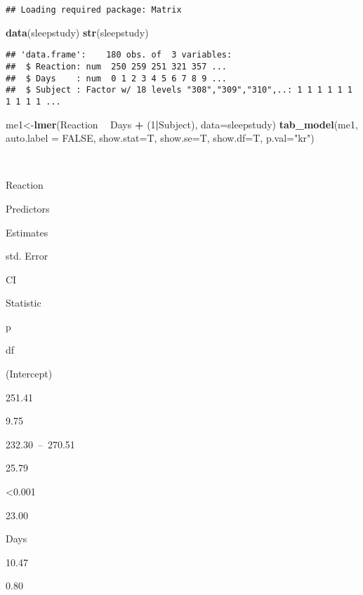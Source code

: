 \documentclass[]{article}
\newenvironment{Shaded}{\begin{snugshade}}{\end{snugshade}}
\newcommand{\KeywordTok}[1]{\textcolor[rgb]{0.13,0.29,0.53}{\textbf{#1}}}
\newcommand{\DataTypeTok}[1]{\textcolor[rgb]{0.13,0.29,0.53}{#1}}
\newcommand{\DecValTok}[1]{\textcolor[rgb]{0.00,0.00,0.81}{#1}}
\newcommand{\StringTok}[1]{\textcolor[rgb]{0.31,0.60,0.02}{#1}}
\newcommand{\OtherTok}[1]{\textcolor[rgb]{0.56,0.35,0.01}{#1}}
\newcommand{\OperatorTok}[1]{\textcolor[rgb]{0.81,0.36,0.00}{\textbf{#1}}}
\newcommand{\NormalTok}[1]{#1}
\begin{document}
\begin{verbatim}
## Loading required package: Matrix
\end{verbatim}

\begin{Shaded}
\begin{Highlighting}[]
\KeywordTok{data}\NormalTok{(sleepstudy)}
\KeywordTok{str}\NormalTok{(sleepstudy)}
\end{Highlighting}
\end{Shaded}

\begin{verbatim}
## 'data.frame':    180 obs. of  3 variables:
##  $ Reaction: num  250 259 251 321 357 ...
##  $ Days    : num  0 1 2 3 4 5 6 7 8 9 ...
##  $ Subject : Factor w/ 18 levels "308","309","310",..: 1 1 1 1 1 1 1 1 1 1 ...
\end{verbatim}

\begin{Shaded}
\begin{Highlighting}[]
\NormalTok{me1<-}\KeywordTok{lmer}\NormalTok{(Reaction }\OperatorTok{~}\StringTok{ }\NormalTok{Days }\OperatorTok{+}\StringTok{ }\NormalTok{(}\DecValTok{1}\OperatorTok{|}\NormalTok{Subject), }\DataTypeTok{data=}\NormalTok{sleepstudy)}
\KeywordTok{tab_model}\NormalTok{(me1, }\DataTypeTok{auto.label =} \OtherTok{FALSE}\NormalTok{, }\DataTypeTok{show.stat=}\NormalTok{T, }\DataTypeTok{show.se=}\NormalTok{T, }\DataTypeTok{show.df=}\NormalTok{T, }
          \DataTypeTok{p.val=}\StringTok{"kr"}\NormalTok{)}
\end{Highlighting}
\end{Shaded}

~

Reaction

Predictors

Estimates

std. Error

CI

Statistic

p

df

(Intercept)

251.41

9.75

232.30~--~270.51

25.79

\textless{}0.001

23.00

Days

10.47

0.80
\end{document}
